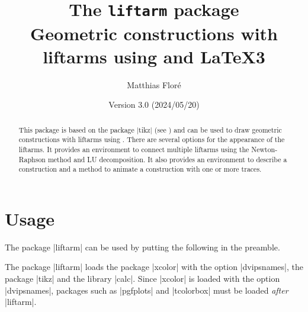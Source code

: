 \documentclass[a4paper,english,dvipsnames]{ltxdoc}
\title{The \texttt{liftarm} package\\[12pt]\large Geometric constructions with liftarms using \tikzname{} and \LaTeX3}
\author{Matthias Floré}
\date{Version 3.0 (2024/05/20)}%
\begin{document}
\maketitle
\thispagestyle{fancy}
\begin{abstract}
\noindent This package is based on the package |tikz| (see \cite{TtTaPGFp}) and can be used to draw geometric constructions with liftarms using \tikzname. There are several options for the appearance of the liftarms. It provides an environment to connect multiple liftarms using the Newton-Raphson method and LU decomposition. It also provides an environment to describe a construction and a method to animate a construction with one or more traces.%
\end{abstract}
\tableofcontents
\section{Usage}
The package |liftarm| can be used by putting the following in the preamble.
\begin{codeexample}
\usepackage{liftarm}
\end{codeexample}
The package |liftarm| loads the package |xcolor| with the option |dvipsnames|, the package |tikz| and the \tikzname{} library |calc|. Since |xcolor| is loaded with the option |dvipsnames|, packages such as |pgfplots| and |tcolorbox| must be loaded \emph{after} |liftarm|.
\end{document}
